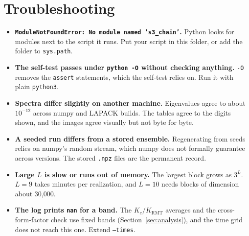 \documentclass[11pt,a4paper]{article}
\newcommand{\code}[1]{\texttt{\textcolor{codeink}{#1}}}
\newcommand{\lead}[1]{\textbf{#1}\enspace}
\begin{document}
\section{Troubleshooting}\label{sec:trouble}

\begin{itemize}
  \item \lead{\code{ModuleNotFoundError: No module named 's3\_chain'}.} Python looks for modules next to the script it
    runs. Put your script in this folder, or add the folder to \code{sys.path}.
  \item \lead{The self-test passes under \code{python -O} without checking anything.} \code{-O} removes the
    \code{assert} statements, which the self-test relies on. Run it with plain \code{python3}.
  \item \lead{Spectra differ slightly on another machine.} Eigenvalues agree to about $10^{-12}$ across numpy and
    LAPACK builds. The tables agree to the digits shown, and the images agree visually but not byte for byte.
  \item \lead{A seeded run differs from a stored ensemble.} Regenerating from seeds relies on numpy's random stream,
    which numpy does not formally guarantee across versions. The stored \code{.npz} files are the permanent record.
  \item \lead{Large $L$ is slow or runs out of memory.} The largest block grows as $3^L$. $L = 9$ takes minutes per
    realization, and $L = 10$ needs blocks of dimension about 30,000.
  \item \lead{The log prints \code{nan} for a band.} The $K_c/K_{\mathrm{RMT}}$ averages and the cross-form-factor
    check use fixed bands (Section~\ref{sec:analysis}), and the time grid does not reach this one. Extend
    \code{--times}.
\end{itemize}
\end{document}
